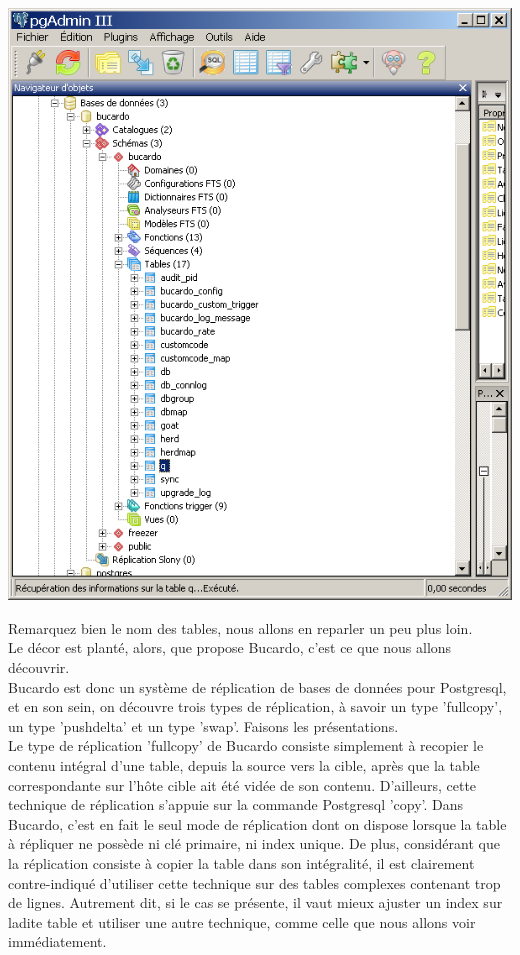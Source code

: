 \documentclass[12pt]{report}
\begin{document}
\includegraphics[width=\linewidth]{./pgadmin2.png}

Remarquez bien le nom des tables, nous allons en reparler un peu plus loin. \\

Le décor est planté, alors, que propose Bucardo, c'est ce que nous allons
découvrir. \\

Bucardo est donc un système de réplication de bases de données pour Postgresql,
et en son sein, on découvre trois types de réplication, à savoir un type
'fullcopy', un type 'pushdelta' et un type 'swap'. Faisons les présentations. \\


Le type de réplication 'fullcopy' de Bucardo consiste simplement à recopier le
contenu intégral d'une table, depuis la source vers la cible, après que la table
correspondante sur l'hôte cible ait été vidée de son contenu. D'ailleurs, cette
technique de réplication s'appuie sur la commande Postgresql 'copy'. Dans
Bucardo, c'est en fait le seul mode de réplication dont on dispose lorsque la
table à répliquer ne possède ni clé primaire, ni index unique. De plus,
considérant que la réplication consiste à copier la table dans son intégralité,
il est clairement contre-indiqué d'utiliser cette technique sur des tables
complexes contenant trop de lignes. Autrement dit, si le cas se présente, il
vaut mieux ajuster un index sur ladite table et utiliser une autre technique,
comme celle que nous allons voir immédiatement. \\
\end{document}
